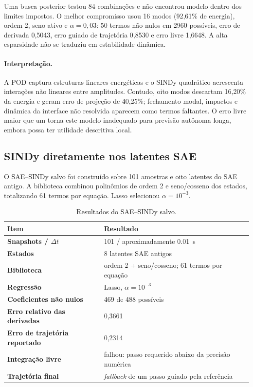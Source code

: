 \documentclass[12pt,a4paper]{article}
\begin{document}
Uma busca posterior testou 84 combinações e não encontrou modelo dentro dos limites impostos. O melhor compromisso usou 16 modos (92,61\% de energia), ordem 2, seno ativo e $\alpha=0,03$: 50 termos não nulos em 2960 possíveis, erro de derivada 0,5043, erro guiado de trajetória 0,8530 e erro livre 1,6648. A alta esparsidade não se traduziu em estabilidade dinâmica.

\paragraph{Interpretação.} A POD captura estruturas lineares energéticas e o SINDy quadrático acrescenta interações não lineares entre amplitudes. Contudo, oito modos descartam 16,20\% da energia e geram erro de projeção de 40,25\%; fechamento modal, impactos e dinâmica da interface não resolvida aparecem como termos faltantes. O erro livre maior que um torna este modelo inadequado para previsão autônoma longa, embora possa ter utilidade descritiva local.

\subsection{SINDy diretamente nos latentes SAE}
O SAE--SINDy salvo foi construído sobre 101 amostras e oito latentes do SAE antigo. A biblioteca combinou polinômios de ordem 2 e seno/cosseno dos estados, totalizando 61 termos por equação. Lasso selecionou $\alpha=10^{-3}$.

\begin{table}[H]
\centering
\caption{Resultados do SAE--SINDy salvo.}
\label{tab:saesindy}
\begin{tabularx}{\textwidth}{>{\bfseries}l X}
\toprule
Item & Resultado\\
\midrule
Snapshots / $\Delta t$ & 101 / aproximadamente \SI{0.01}{s}\\
Estados & 8 latentes SAE antigos\\
Biblioteca & ordem 2 + seno/cosseno; 61 termos por equação\\
Regressão & Lasso, $\alpha=10^{-3}$\\
Coeficientes não nulos & 469 de 488 possíveis\\
Erro relativo das derivadas & 0,3661\\
Erro de trajetória reportado & 0,2314\\
Integração livre & falhou: passo requerido abaixo da precisão numérica\\
Trajetória final & \emph{fallback} de um passo guiado pela referência\\
\bottomrule
\end{tabularx}
\end{table}
\end{document}
